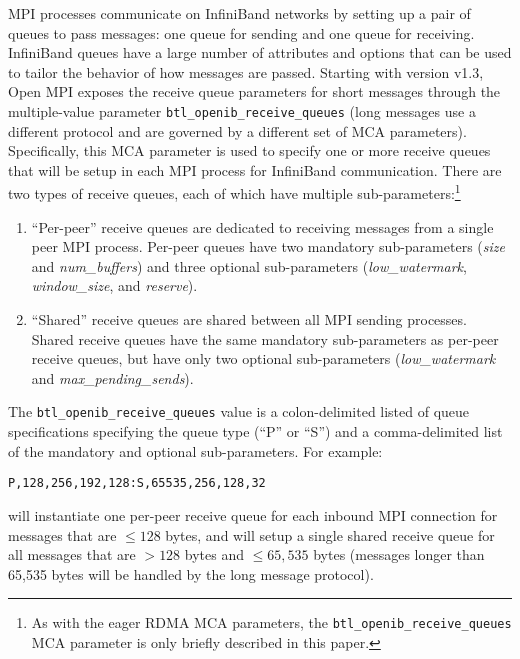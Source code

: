 MPI processes communicate on InfiniBand networks by setting up a pair
of queues to pass messages: one queue for sending and one queue for
receiving.  InfiniBand queues have a large number of attributes and
options that can be used to tailor the behavior of how messages are
passed.  Starting with version v1.3, Open MPI exposes the receive
queue parameters for short messages through the multiple-value
parameter {\tt btl\_\-openib\_\-receive\_\-queues} (long messages use
a different protocol and are governed by a different set of MCA
parameters).  Specifically, this MCA parameter is used to specify one
or more receive queues that will be setup in each MPI process for
InfiniBand communication.  There are two types of receive queues, each
of which have multiple sub-parameters:\footnote{As with the eager RDMA
  MCA parameters, the {\tt btl\_\-openib\_\-receive\_\-queues} MCA
  parameter is only briefly described in this paper.}

\begin{enumerate}
\item ``Per-peer'' receive queues are dedicated to receiving messages
  from a single peer MPI process. Per-peer queues have two mandatory
  sub-parameters ({\em size} and {\em num\_\-buffers}) and three
  optional sub-parameters ({\em low\_\-watermark}, {\em
    window\_\-size}, and {\em reserve}).

\item ``Shared'' receive queues are shared between all MPI sending
  processes. Shared receive queues have the same mandatory
  sub-parameters as per-peer receive queues, but have only two
  optional sub-parameters ({\em low\_\-watermark} and {\em
    max\_\-pending\_\-sends}).
\end{enumerate}

The {\tt btl\_\-openib\_\-receive\_\-queues} value is a
colon-delimited listed of queue specifications specifying the queue
type (``P'' or ``S'') and a comma-delimited list of the mandatory and
optional sub-parameters.  For example:

\vspace{5pt}
\centerline{\tt P,128,256,192,128:S,65535,256,128,32}
\vspace{5pt}

will instantiate one per-peer receive queue for each inbound MPI
connection for messages that are $\le128$ bytes, and will setup a
single shared receive queue for all messages that are $>128$ bytes and
$\le65,535$ bytes (messages longer than 65,535 bytes will be handled
by the long message protocol).

